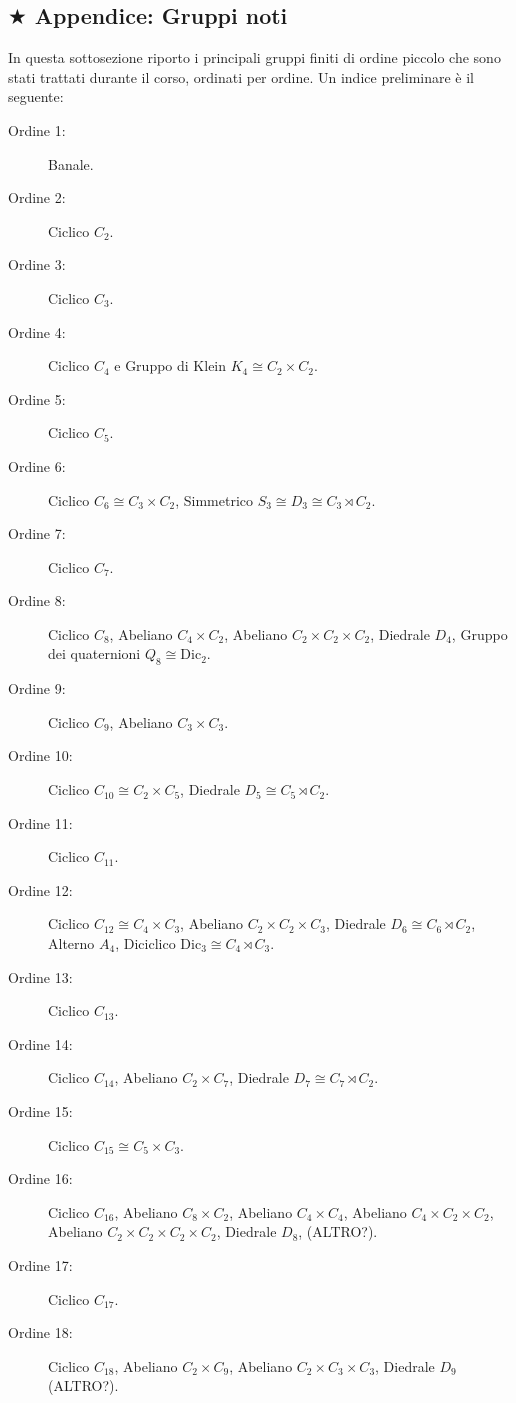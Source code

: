 \documentclass[11pt]{scrartcl}
\begin{document}
	\newpage
	
	\subsection{$\bigstar$ Appendice: Gruppi noti}
	
	In questa sottosezione riporto i principali gruppi finiti di ordine piccolo che sono stati trattati durante il corso, ordinati per ordine. Un indice preliminare è il seguente: 
	\begin{description}
		\item[Ordine 1:] Banale.
		\item[Ordine 2:] Ciclico $C_2$.
		\item[Ordine 3:] Ciclico $C_3$. 
		\item[Ordine 4:] Ciclico $C_4$ e Gruppo di Klein $K_4\cong C_2\times C_2$.
		\item[Ordine 5:] Ciclico $C_5$.
		\item[Ordine 6:] Ciclico $C_6\cong C_3\times C_2$, Simmetrico $S_3\cong D_3\cong C_3 \rtimes C_2$.
		\item[Ordine 7:] Ciclico $C_7$.
		\item[Ordine 8:] Ciclico $C_8$, Abeliano $C_4 \times C_2$, Abeliano $C_2\times C_2 \times C_2$, Diedrale $D_4$, Gruppo dei quaternioni $Q_8\cong \text{Dic}_2$.
		\item[Ordine 9:] Ciclico $C_9$, Abeliano $C_3\times C_3$.
		\item[Ordine 10:] Ciclico $C_{10} \cong C_2\times C_5$, Diedrale $D_5\cong C_5\rtimes C_2$.
		\item[Ordine 11:] Ciclico $C_{11}$.
		\item[Ordine 12:] Ciclico $C_{12} \cong C_{4}\times C_3$, Abeliano $C_2\times C_2\times C_3$, Diedrale $D_6\cong C_6 \rtimes C_2$, Alterno $A_4$, Diciclico $\text{Dic}_3\cong C_4 \rtimes C_3$.
		\item[Ordine 13:] Ciclico $C_{13}$.
		\item[Ordine 14:] Ciclico $C_{14}$, Abeliano $C_2\times C_7$, Diedrale $D_7\cong C_7 \rtimes C_2$.
		\item[Ordine 15:] Ciclico $C_{15}\cong C_5\times C_3$. 
		\item[Ordine 16:] Ciclico $C_{16}$, Abeliano $C_{8}\times C_{2}$, Abeliano $C_4\times C_4$, Abeliano $C_4\times C_2\times C_2$, Abeliano $C_2\times C_2\times C_2\times C_2$, Diedrale $D_8$, (ALTRO?). 
		\item[Ordine 17:] Ciclico $C_{17}$.
		\item[Ordine 18:] Ciclico $C_{18}$, Abeliano $C_2\times C_9$, Abeliano $C_2\times C_3\times C_3$, Diedrale $D_9$ (ALTRO?).

\end{description}
\end{document}
